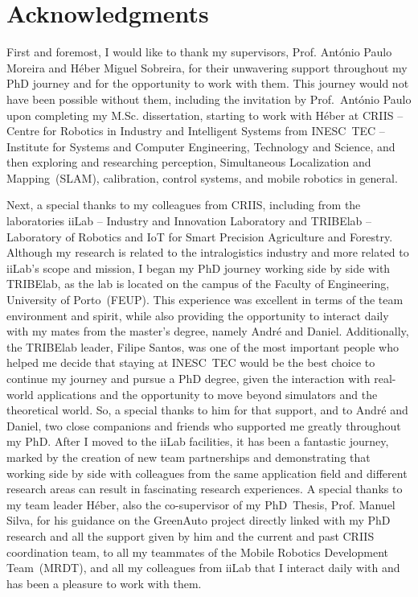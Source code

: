 \chapter*{Acknowledgments}

First and foremost, I would like to thank my supervisors,
Prof. António Paulo Moreira and Héber Miguel Sobreira,
for their unwavering support throughout my PhD journey and for the opportunity
to work with them. This journey would not have been possible without them,
including the invitation by Prof.~António Paulo upon completing my M.Sc.
dissertation, starting to work with Héber at
CRIIS -- Centre for Robotics in Industry and Intelligent Systems from
INESC~TEC -- Institute for Systems and Computer Engineering, Technology and Science,
and then exploring and researching perception,
Simultaneous Localization and Mapping~(SLAM), calibration, control systems, and
mobile robotics in general.

Next, a special thanks to my colleagues from CRIIS, including from the
laboratories iiLab -- Industry and Innovation Laboratory and
TRIBElab -- Laboratory of Robotics and IoT for Smart Precision Agriculture and Forestry.
Although my research is related to the intralogistics industry and more
related to iiLab's scope and mission,
I began my PhD journey working side by side with TRIBElab, as the lab is located
on the campus of the Faculty of Engineering, University of Porto~(FEUP).
This experience was excellent in terms of the team environment and spirit,
while also providing the opportunity to interact daily with my mates from the
master's degree, namely André and Daniel. Additionally, the TRIBElab leader,
Filipe Santos, was one of the most important people who helped me decide that
staying at INESC~TEC would be the best choice to continue my journey and pursue
a PhD degree, given the interaction with real-world applications and the
opportunity to move beyond simulators and the theoretical world.
So, a special thanks to him for that support, and to André and Daniel,
two close companions and friends who supported me greatly throughout my PhD.
After I moved to the iiLab facilities, it has been a fantastic journey,
marked by the creation of new team partnerships and demonstrating that working
side by side with colleagues from the same application field and different
research areas can result in fascinating research experiences.
A special thanks to my team leader Héber, also the co-supervisor of my
PhD~Thesis, Prof. Manuel Silva, for his guidance on the GreenAuto project
directly linked with my PhD research and all the support given by him and the
current and past CRIIS coordination team, to all my teammates of the
Mobile Robotics Development Team~(MRDT), and all my colleagues from iiLab that
I interact daily with and has been a pleasure to work with them.


